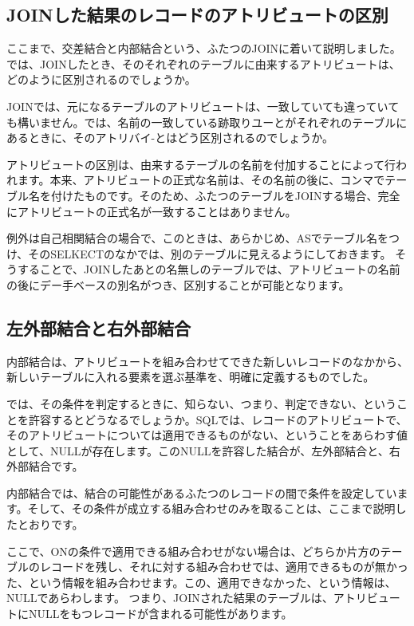 \subsection{JOINした結果のレコードのアトリビュートの区別}

ここまで、交差結合と内部結合という、ふたつのJOINに着いて説明しました。では、JOINしたとき、そのそれぞれのテーブルに由来するアトリビュートは、どのように区別されるのでしょうか。

JOINでは、元になるテーブルのアトリビュートは、一致していても違っていても構いません。では、名前の一致している跡取りユーとがそれぞれのテーブルにあるときに、そのアトリバイ-とはどう区別されるのでしょうか。

アトリビュートの区別は、由来するテーブルの名前を付加することによって行われます。本来、アトリビュートの正式な名前は、その名前の後に、コンマでテーブル名を付けたものです。そのため、ふたつのテーブルをJOINする場合、完全にアトリビュートの正式名が一致することはありません。

例外は自己相関結合の場合で、このときは、あらかじめ、ASでテーブル名をつけ、そのSELKECTのなかでは、別のテーブルに見えるようにしておきます。
そうすることで、JOINしたあとの名無しのテーブルでは、アトリビュートの名前の後にデー手ベースの別名がつき、区別することが可能となります。

\subsection{左外部結合と右外部結合}

内部結合は、アトリビュートを組み合わせてできた新しいレコードのなかから、新しいテーブルに入れる要素を選ぶ基準を、明確に定義するものでした。

では、その条件を判定するときに、知らない、つまり、判定できない、ということを許容するとどうなるでしょうか。SQLでは、レコードのアトリビュートで、そのアトリビュートについては適用できるものがない、ということをあらわす値として、NULLが存在します。このNULLを許容した結合が、左外部結合と、右外部結合です。

内部結合では、結合の可能性があるふたつのレコードの間で条件を設定しています。そして、その条件が成立する組み合わせのみを取ることは、ここまで説明したとおりです。

ここで、ONの条件で適用できる組み合わせがない場合は、どちらか片方のテーブルのレコードを残し、それに対する組み合わせでは、適用できるものが無かった、という情報を組み合わせます。この、適用できなかった、という情報は、NULLであらわします。
つまり、JOINされた結果のテーブルは、アトリビュートにNULLをもつレコードが含まれる可能性があります。

